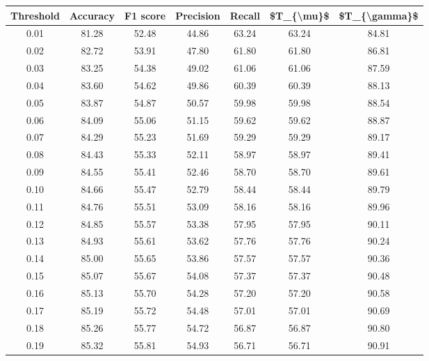 \begin{tabular}{|c|c|c|c|c|c|c|}
\hline
 Threshold &  Accuracy &  F1 score &  Precision &  Recall &  \$T\_\{\textbackslash mu\}\$ &  \$T\_\{\textbackslash gamma\}\$ \\
\hline
      0.01 &     81.28 &     52.48 &      44.86 &   63.24 &      63.24 &         84.81 \\
      0.02 &     82.72 &     53.91 &      47.80 &   61.80 &      61.80 &         86.81 \\
      0.03 &     83.25 &     54.38 &      49.02 &   61.06 &      61.06 &         87.59 \\
      0.04 &     83.60 &     54.62 &      49.86 &   60.39 &      60.39 &         88.13 \\
      0.05 &     83.87 &     54.87 &      50.57 &   59.98 &      59.98 &         88.54 \\
      0.06 &     84.09 &     55.06 &      51.15 &   59.62 &      59.62 &         88.87 \\
      0.07 &     84.29 &     55.23 &      51.69 &   59.29 &      59.29 &         89.17 \\
      0.08 &     84.43 &     55.33 &      52.11 &   58.97 &      58.97 &         89.41 \\
      0.09 &     84.55 &     55.41 &      52.46 &   58.70 &      58.70 &         89.61 \\
      0.10 &     84.66 &     55.47 &      52.79 &   58.44 &      58.44 &         89.79 \\
      0.11 &     84.76 &     55.51 &      53.09 &   58.16 &      58.16 &         89.96 \\
      0.12 &     84.85 &     55.57 &      53.38 &   57.95 &      57.95 &         90.11 \\
      0.13 &     84.93 &     55.61 &      53.62 &   57.76 &      57.76 &         90.24 \\
      0.14 &     85.00 &     55.65 &      53.86 &   57.57 &      57.57 &         90.36 \\
      0.15 &     85.07 &     55.67 &      54.08 &   57.37 &      57.37 &         90.48 \\
      0.16 &     85.13 &     55.70 &      54.28 &   57.20 &      57.20 &         90.58 \\
      0.17 &     85.19 &     55.72 &      54.48 &   57.01 &      57.01 &         90.69 \\
      0.18 &     85.26 &     55.77 &      54.72 &   56.87 &      56.87 &         90.80 \\
      0.19 &     85.32 &     55.81 &      54.93 &   56.71 &      56.71 &         90.91 \\

\end{tabular}
